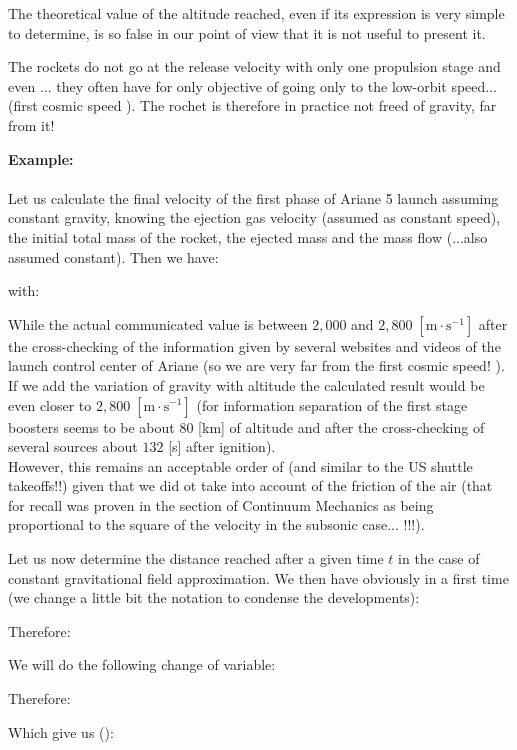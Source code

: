 	The theoretical value of the altitude reached, even if its expression is very simple to determine, is so false in our point of view that it is not useful to present it.
	
	The rockets do not go at the release velocity with only one propulsion stage and even ... they often have for only objective of going only to the low-orbit speed... (first cosmic speed ). The rochet is therefore in practice not freed of gravity, far from it!
	\begin{tcolorbox}[colframe=black,colback=white,sharp corners]
	\textbf{{\Large {}}Example:}\\\\
	Let us calculate the final velocity of the first phase of Ariane 5 launch assuming constant gravity, knowing the ejection gas velocity (assumed as constant speed), the initial total mass of the rocket, the ejected mass and the mass flow (...also assumed constant). Then we have:
	
	with:
	
	While the actual communicated value is between $2,000$ and $2,800\; [\text{m}\cdot\text{s}^{-1}]$ after the cross-checking of the information given by several websites and videos of the launch control center of Ariane (so we are very far from the first cosmic speed! ). If we add the variation of gravity with altitude the calculated result would be even closer to $2,800\; [\text{m}\cdot\text{s}^{-1}]$ (for information separation of the first stage boosters seems to be about $80$ [km] of altitude and after the cross-checking of several sources about $132$ [s] after ignition).\\
	
	However, this remains an acceptable order of (and similar to the US shuttle takeoffs!!) given that we did ot take into account of the friction of the air (that for recall was proven in the section of Continuum Mechanics as being proportional to the square of the velocity in the subsonic case... !!!).
	\end{tcolorbox}
	Let us now determine the distance reached after a given time $t$ in the case of constant gravitational field approximation. We then have obviously in a first time (we change a little bit the notation to condense the developments):
	
	Therefore:
	
	We will do the following change of variable:
	
	Therefore:
	
	Which give us ():
	
